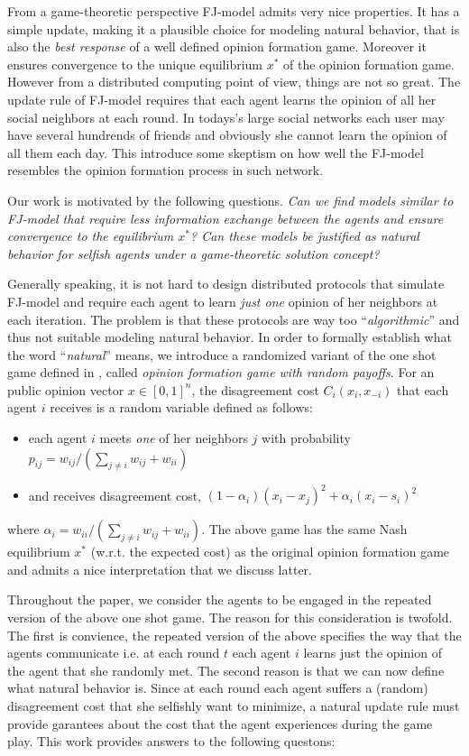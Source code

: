 From a game-theoretic perspective FJ-model admits
very nice properties. It has a simple update, making it
a plausible choice for modeling natural behavior, that
is also the \emph{best response} of a well 
defined opinion formation game. Moreover it ensures
convergence to the unique equilibrium $x^*$ of the opinion 
formation game. However from a 
distributed computing point of view, things are not
so great. The update rule of FJ-model requires that each agent learns
the opinion of all her social neighbors at each 
round. In todays's large social networks each user
may have several hundrends of friends and obviously
she cannot learn the opinion of all them each day.
This introduce some skeptism on how well the 
FJ-model resembles the opinion formation process in such
network.

Our work is motivated by the following questions.
\emph{
Can we find models similar to FJ-model that 
require less information exchange between the agents
and ensure convergence to the equilibrium $x^*$?
Can these models be justified as natural behavior for selfish
agents under a game-theoretic solution concept?}

Generally speaking, it is not hard to 
design distributed protocols that simulate FJ-model
and require each agent to learn \emph{just one} opinion 
of her neighbors at each iteration. The problem is that these protocols 
are way too \enquote{\emph{algorithmic}} and thus not suitable modeling 
natural behavior. In order to formally establish what
the word \enquote{\emph{natural}} means, we introduce a randomized 
variant of the one shot game defined in \cite{BKO11},
called \emph{opinion formation game with random payoffs}.
For an public opinion vector $x \in [0,1]^n$, the disagreement 
cost $C_i(x_i,x_{-i})$ that each agent $i$ receives is
a random variable defined as follows:
\begin{itemize}
 \item each agent $i$ meets \emph{one} of her neighbors $j$ with probability
 $p_{ij}=w_{ij}/(\sum_{j\neq i}w_{ij}+w_{ii})$
 \item and receives disagreement cost, $(1-\alpha_i)(x_i-x_j)^2 + \alpha_i(x_i-s_i)^2$ 
\end{itemize}
where $\alpha_i=w_{ii}/(\sum_{j\neq i}w_{ij}+w_{ii})$. The above game
has the same Nash equilibrium $x^*$ (w.r.t. the expected cost) as
the original opinion formation game and admits a nice interpretation
that we discuss latter.

Throughout the paper, we consider the agents to be engaged in the repeated 
version of the above one shot game. The reason for this
consideration is twofold. The first is convience, the repeated
version of the above specifies the way that the agents communicate i.e.
at each round $t$ each agent $i$ learns just the opinion 
of the agent that she randomly met. The second reason is that we can now define 
what natural behavior is. Since at each round each agent
suffers a (random) disagreement cost that she selfishly want 
to minimize, a natural update rule must provide garantees about
the cost that the agent experiences during the game play.
This work provides answers to the following questons:

